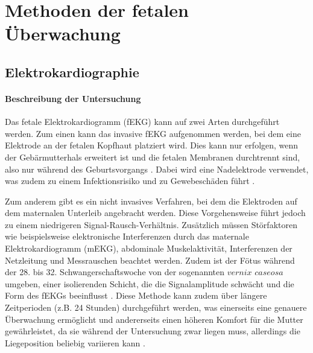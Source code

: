\documentclass[10pt,a4paper,headinclude,twoside, plainheadsepline, open=right, numbers=noenddot, twocolumn]{article}
\begin{document}


\section{Methoden der fetalen Überwachung}
\label{methods}

\subsection{Elektrokardiographie}
\label{ecg}

\paragraph{Beschreibung der Untersuchung}
Das fetale Elektrokardiogramm (fEKG) kann auf zwei Arten durchgeführt werden.
Zum einen kann das invasive fEKG aufgenommen werden, bei dem eine Elektrode an der fetalen Kopfhaut platziert wird.
Dies kann nur erfolgen, wenn der Gebärmutterhals erweitert ist und die fetalen Membranen durchtrennt sind, also nur während des Geburtsvorgangs \cite{warmerdam2018hierarchical}.
Dabei wird eine Nadelektrode verwendet, was zudem zu einem Infektionsrisiko und zu Gewebeschäden führt \cite{rooijakkers2012low}.

Zum anderem gibt es ein nicht invasives Verfahren, bei dem die Elektroden auf dem maternalen Unterleib angebracht werden. Diese Vorgehensweise führt jedoch zu einem niedrigeren  Signal-Rausch-Verhältnis.
 Zusätzlich müssen Störfaktoren wie beispielsweise elektronische Interferenzen durch das maternale Elektrokardiogramm (mEKG), abdominale Muskelaktivität, Interferenzen der Netzleitung und Messrauschen beachtet werden.
Zudem ist der Fötus während der 28. bis 32. Schwangerschaftswoche von der sogenannten $vernix$ $caseosa$ umgeben, einer isolierenden Schicht, die die Signalamplitude schwächt und die Form des fEKGs beeinflusst \cite{warmerdam2018hierarchical}.
Diese Methode kann zudem über längere Zeitperioden (z.B. 24 Stunden) durchgeführt werden, was einerseits eine genauere Überwachung ermöglicht und andererseits einen höheren Komfort für die Mutter gewährleistet, da sie während der Untersuchung zwar liegen muss, allerdings die Liegeposition beliebig variieren kann \cite{hasan2009detection}.
\end{document}
